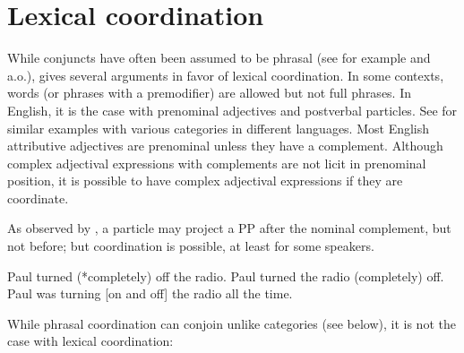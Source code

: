 \documentclass[output=paper]{langsci/langscibook}
\begin{document}
\section{Lexical coordination}\label{lexcoord}


While conjuncts have often been assumed to be phrasal (see for example \citet{Kayne:94} and \citet{bruening} a.o.), \citet{Abeille:06} gives several arguments in favor of lexical coordination.
In some contexts, words (or phrases with a premodifier) are allowed but not full phrases. In English, it is the case with prenominal adjectives and postverbal particles. See \citet{Abeille:06} for similar examples with various categories in different languages. Most English attributive adjectives are prenominal unless they have a complement. Although complex adjectival expressions with complements are not licit in prenominal position,  it is possible to have complex adjectival expressions if they are coordinate.

\begin{exe}
 \ex
\begin{xlista}
\end{xlista}
\end{exe}

As observed by \citet{hpsg1}, a particle may project a  PP  after the nominal complement, but not before; but coordination is possible, at least for some speakers.

\begin{exe}
 \ex
\begin{xlista}
\ex Paul turned (*completely) off the radio.
\ex Paul turned the radio (completely) off.
\ex Paul was turning [on and off] the radio all the time.
\end{xlista}
\end{exe}

While phrasal coordination can conjoin unlike categories (see below), it is not the case with lexical coordination:

\begin{exe}
 \ex
\begin{xlista}
\end{xlista}
\end{exe}
\end{document}
